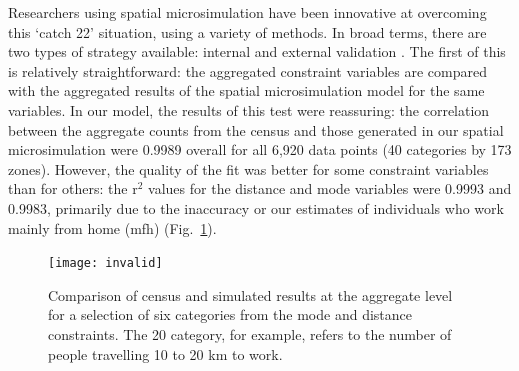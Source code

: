 Researchers using spatial microsimulation have been innovative at
overcoming this `catch 22' situation, using a variety of methods.
In broad terms, there are two types of strategy available:
internal and external validation \citep{edwards2013validation}.
The first of this is relatively
straightforward: the aggregated constraint variables are compared with the
aggregated results of the spatial microsimulation model for the same variables.
In our model, the results of this test were reassuring: the correlation between the
aggregate counts from the census and those generated in our spatial microsimulation
were 0.9989 overall for all 6,920 data points (40 categories by 173 zones).
However, the quality of the fit was better for some constraint variables than
for others: the r$^2$ values for the distance and mode variables were
0.9993 and 0.9983, primarily due to the inaccuracy or our estimates of
individuals who work mainly from home (mfh) (Fig.~\ref{finvalid}).


\begin{figure} \begin{center}
    \texttt{[image: invalid]}
 \end{center}
 \caption[Comparison of census and simulated results at the aggregate level]
 {Comparison of census and simulated results at the aggregate level
 for a selection of six categories from the mode and distance constraints.
 The 20 category, for example, refers to the number of people travelling
 10 to 20 km to work.} \label{finvalid}
\end{figure}


